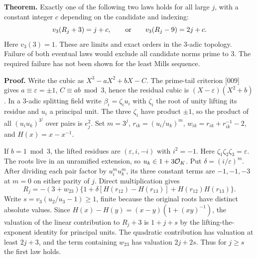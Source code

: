\documentclass[11pt,a4paper,oneside,openany]{book}
\begin{document}
\textbf{Theorem.} Exactly one of the following two laws holds for all large $j$, with a constant integer $c$ depending on the candidate and indexing:
\[
 v_3(R_j+3)=j+c,\qquad\hbox{or}\qquad v_3(R_j-9)=2j+c.
\]
Here $v_3(3)=1$. These are limits and exact orders in the $3$-adic topology. Failure of both eventual laws would exclude all candidate norms prime to $3$. The required failure has not been shown for the least Mills sequence.

\textbf{Proof.} Write the cubic as $X^3-aX^2+bX-C$. The prime-tail criterion [009] gives $a\equiv\varepsilon=\pm1$, $C\equiv ab\bmod3$, hence the residual cubic is $(X-\varepsilon)(X^2+b)$. In a $3$-adic splitting field write $\beta_i=\zeta_i u_i$ with $\zeta_i$ the root of unity lifting its residue and $u_i$ a principal unit. The three $\zeta_i$ have product $\pm1$, so the product of all $(u_i u_k)^{3^j}$ over pairs is $e_j^2$. Set $m=3^j$, $r_{ik}=(u_i/u_k)^m$, $w_{ik}=r_{ik}+r_{ik}^{-1}-2$, and $H(x)=x-x^{-1}$.

If $b=1\bmod3$, the lifted residues are $(\varepsilon,i,-i)$ with $i^2=-1$. Here $\zeta_1\zeta_2\zeta_3=\varepsilon$. The roots live in an unramified extension, so $u_k\in1+3\mathcal O_K$. Put $\delta=(i/\varepsilon)^m$. After dividing each pair factor by $u_i^m u_k^m$, its three constant terms are $-1,-1,-3$ at $m=0$ on either parity of $j$. Direct multiplication gives
\[
 R_j=-(3+w_{23})\{1+\delta[H(r_{12})-H(r_{13})]+H(r_{12})H(r_{13})\}.
\]
Write $s=v_3(u_2/u_3-1)\ge1$, finite because the original roots have distinct absolute values. Since $H(x)-H(y)=(x-y)(1+(xy)^{-1})$, the valuation of the linear contribution to $R_j+3$ is $1+j+s$ by the lifting-the-exponent identity for principal units. The quadratic contribution has valuation at least $2j+3$, and the term containing $w_{23}$ has valuation $2j+2s$. Thus for $j\ge s$ the first law holds.
\end{document}
